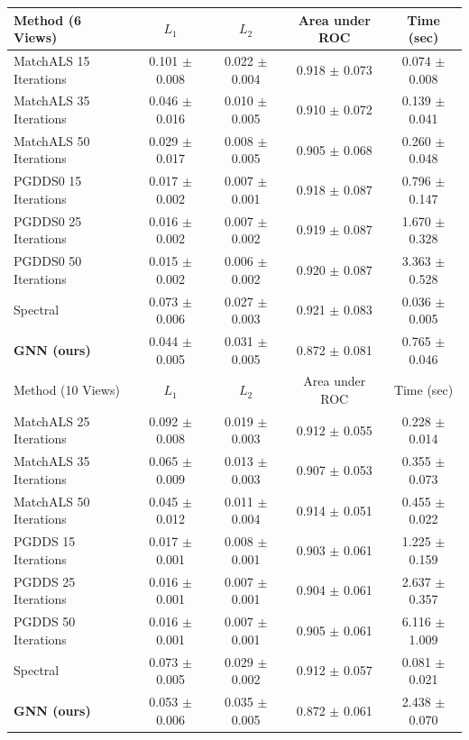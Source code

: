 \documentclass{article} %
\begin{document}
\begin{table}[t]
\begin{center}
\begin{tabular}{|l|c|c|c|c|}
\hline
Method (6 Views)                                     & $L_1$             & $L_2$             & Area under ROC    & Time (sec)        \\
\hline\hline
MatchALS 15 Iterations & 0.101 $\pm$ 0.008 & 0.022 $\pm$ 0.004 & 0.918 $\pm$ 0.073 & 0.074 $\pm$ 0.008 \\ \hline
MatchALS 35 Iterations & 0.046 $\pm$ 0.016 & 0.010 $\pm$ 0.005 & 0.910 $\pm$ 0.072 & 0.139 $\pm$ 0.041 \\ \hline
MatchALS 50 Iterations & 0.029 $\pm$ 0.017 & 0.008 $\pm$ 0.005 & 0.905 $\pm$ 0.068 & 0.260 $\pm$ 0.048 \\ \hline
PGDDS0 15 Iterations   & 0.017 $\pm$ 0.002 & 0.007 $\pm$ 0.001 & 0.918 $\pm$ 0.087 & 0.796 $\pm$ 0.147 \\ \hline
PGDDS0 25 Iterations   & 0.016 $\pm$ 0.002 & 0.007 $\pm$ 0.002 & 0.919 $\pm$ 0.087 & 1.670 $\pm$ 0.328 \\ \hline
PGDDS0 50 Iterations   & 0.015 $\pm$ 0.002 & 0.006 $\pm$ 0.002 & 0.920 $\pm$ 0.087 & 3.363 $\pm$ 0.528 \\ \hline
Spectral               & 0.073 $\pm$ 0.006 & 0.027 $\pm$ 0.003 & 0.921 $\pm$ 0.083 & 0.036 $\pm$ 0.005 \\ \hline
\textbf{GNN (ours)}    & 0.044 $\pm$ 0.005 & 0.031 $\pm$ 0.005 & 0.872 $\pm$ 0.081 & 0.765 $\pm$ 0.046 \\ \hline

\hline\hline
Method (10 Views)                                   & $L_1$             & $L_2$             & Area under ROC    & Time (sec)        \\
\hline\hline
MatchALS 25 Iterations & 0.092 $\pm$ 0.008 & 0.019 $\pm$ 0.003 & 0.912 $\pm$ 0.055 & 0.228 $\pm$ 0.014 \\ \hline
MatchALS 35 Iterations & 0.065 $\pm$ 0.009 & 0.013 $\pm$ 0.003 & 0.907 $\pm$ 0.053 & 0.355 $\pm$ 0.073 \\ \hline
MatchALS 50 Iterations & 0.045 $\pm$ 0.012 & 0.011 $\pm$ 0.004 & 0.914 $\pm$ 0.051 & 0.455 $\pm$ 0.022 \\ \hline
PGDDS 15 Iterations    & 0.017 $\pm$ 0.001 & 0.008 $\pm$ 0.001 & 0.903 $\pm$ 0.061 & 1.225 $\pm$ 0.159 \\ \hline
PGDDS 25 Iterations    & 0.016 $\pm$ 0.001 & 0.007 $\pm$ 0.001 & 0.904 $\pm$ 0.061 & 2.637 $\pm$ 0.357 \\ \hline
PGDDS 50 Iterations    & 0.016 $\pm$ 0.001 & 0.007 $\pm$ 0.001 & 0.905 $\pm$ 0.061 & 6.116 $\pm$ 1.009 \\ \hline
Spectral               & 0.073 $\pm$ 0.005 & 0.029 $\pm$ 0.002 & 0.912 $\pm$ 0.057 & 0.081 $\pm$ 0.021 \\ \hline
\textbf{GNN (ours)}    & 0.053 $\pm$ 0.006 & 0.035 $\pm$ 0.005 & 0.872 $\pm$ 0.061 & 2.438 $\pm$ 0.070 \\ \hline


\end{tabular}
\end{center}
\end{table}
\end{document}
